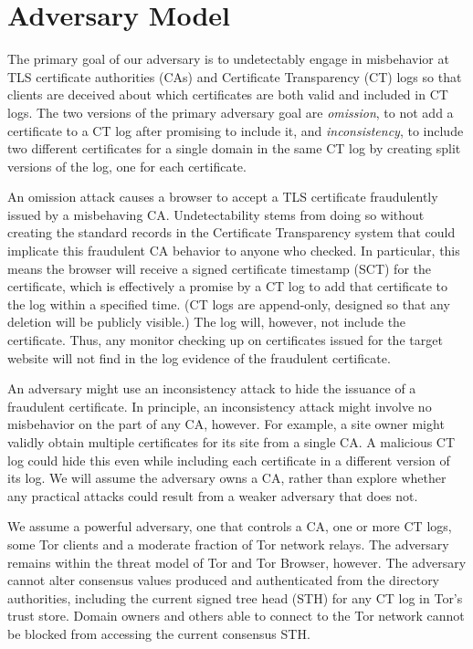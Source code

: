 \section{Adversary Model}
\label{sec:adversary}

The primary goal of our adversary is to undetectably engage in
misbehavior at TLS certificate authorities (CAs) and Certificate
Transparency (CT) logs so that clients are deceived about which
certificates are both valid and included in CT logs.  The two versions
of the primary adversary goal are \emph{omission}, to not add a
certificate to a CT log after promising to include it, and
\emph{inconsistency}, to include two different certificates for a
single domain in the same CT log by creating split versions of the
log, one for each certificate.

An omission attack causes a browser to accept a TLS certificate
fraudulently issued by a misbehaving CA\@. Undetectability stems from
doing so without creating the standard records in the Certificate
Transparency system that could implicate this fraudulent CA behavior
to anyone who checked.  In particular, this means the browser will
receive a signed certificate timestamp (SCT) for the certificate,
which is effectively a promise by a CT log to add that certificate to
the log within a specified time. (CT logs are append-only, designed so
that any deletion will be publicly visible.) The log will, however,
not include the certificate. Thus, any monitor checking up on
certificates issued for the target website will not find in the log
evidence of the fraudulent certificate.

An adversary might use an inconsistency attack to hide the issuance of
a fraudulent certificate.  In principle, an inconsistency attack might
involve no misbehavior on the part of any CA, however. For example, a
site owner might validly obtain multiple certificates for its site from
a single CA\@. A malicious CT log could hide this even while including
each certificate in a different version of its log. We will assume 
the adversary owns a CA, rather than explore whether any practical
attacks could result from a weaker adversary that does not. 

We assume a powerful adversary, one that controls a CA, one or more CT
logs, some Tor clients and a moderate fraction of Tor network
relays. The adversary remains within the threat model of Tor and 
Tor Browser, however. The adversary cannot alter consensus values
produced and authenticated from the directory authorities, including
the current signed tree head (STH) for any CT log in Tor's trust store.
Domain owners and others able to connect to the Tor network cannot
be blocked from accessing the current consensus STH\@.


